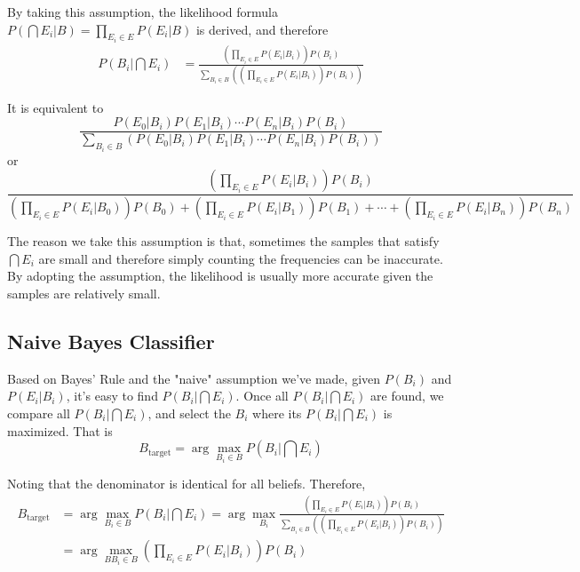 \documentclass{note}
\begin{document}
By taking this assumption, the likelihood formula $P(\bigcap E_i | B) = \prod_{E_i \in E} P(E_i|B)$ is derived, and therefore
\begin{align*}
    P(B_i|\bigcap E_i) 
    & = \frac
    {\left(\prod_{E_i \in E} P(E_i|B_i)\right)P(B_i)}
    {\sum_{B_i \in B}\left(\left(\prod_{E_i \in E} P( E_i|B_i)\right)P(B_i)\right)}
\end{align*}

It is equivalent to 
\begin{equation*}
    \frac
    {P(E_0|B_i) P(E_1|B_i) \cdots P(E_n|B_i) P(B_i)}
    {\sum_{B_i \in B}\left(P(E_0|B_i) P(E_1|B_i) \cdots P(E_n|B_i) P(B_i)\right)}
\end{equation*}
or
\begin{equation*}
    \frac
    {\left(\prod_{E_i \in E} P(E_i|B_i)\right)P(B_i)}
    {\left(\prod_{E_i \in E} P(E_i|B_0)\right)P(B_0) + \left(\prod_{E_i \in E} P(E_i|B_1)\right)P(B_1) + \cdots + \left(\prod_{E_i \in E} P(E_i|B_n)\right)P(B_n)}
\end{equation*}

The reason we take this assumption is that, sometimes the samples that satisfy $\bigcap E_i$ are small and therefore simply counting the frequencies can be inaccurate. By adopting the assumption, the likelihood is usually more accurate given the samples are relatively small.

\subsection{Naive Bayes Classifier}

Based on Bayes' Rule and the "naive" assumption we've made, given $P(B_i)$ and $P(E_i|B_i)$, it's easy to find $P(B_i|\bigcap E_i)$. Once all $P(B_i|\bigcap E_i)$ are found, we compare all $P(B_i|\bigcap E_i)$, and select the $B_i$ where its $P(B_i|\bigcap E_i)$ is maximized. That is
$$
B_\text{target} = \arg\max_{B_i \in B} P(B_i|\bigcap E_i)
$$

Noting that the denominator is identical for all beliefs. Therefore, 
\begin{align*}
    B_\text{target} 
    &= \arg\max_{B_i \in B} P(B_i|\bigcap E_i) = \arg\max_{B_i} \frac{\left(\prod_{E_i \in E} P(E_i|B_i)\right)P(B_i)}{\sum_{B_i \in B}\left(\left(\prod_{E_i \in E} P( E_i|B_i)\right)P(B_i)\right)} \\
    &= \arg\max_{BB_i \in B} \left(\prod_{E_i \in E} P(E_i|B_i)\right)P(B_i)
\end{align*}
\end{document}
